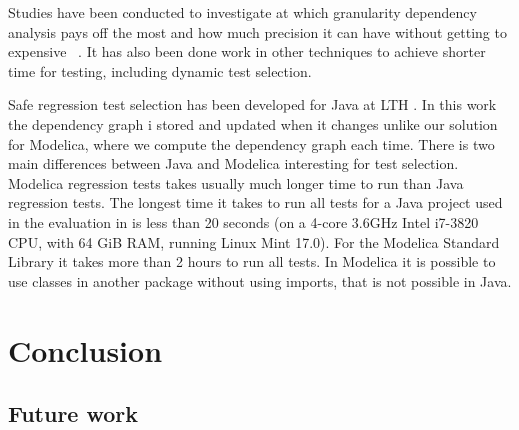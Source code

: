 \documentclass{cslthse-msc}
\begin{document}
Studies have been conducted to investigate at which granularity dependency analysis pays off the most and how much precision it can have without getting to expensive ~\cite{DBLP:conf/sigsoft/LegunsenHSLZM16}. It has also been done work in other techniques to achieve shorter time for testing, including dynamic test selection.

Safe regression test selection has been developed for Java at LTH \cite{DBLP:conf/pppj/OqvistHM16}. In this work the dependency graph i stored and updated when it changes unlike our solution for Modelica, where we compute the dependency graph each time. There is two main differences between Java and Modelica interesting for test selection. Modelica regression tests takes usually much longer time to run than Java regression tests. The longest time it takes to run all tests for a Java project used in the evaluation in \cite{DBLP:conf/pppj/OqvistHM16} is less than 20 seconds (on a 4-core 3.6GHz Intel i7-3820 CPU, with 64 GiB RAM, running Linux Mint 17.0). For the Modelica Standard Library it takes more than 2 hours to run all tests. In Modelica it is possible to use classes in another package without using imports, that is not possible in Java.

\chapter[Conclusion]{Conclusion}


\section{Future work}

\end{document}

